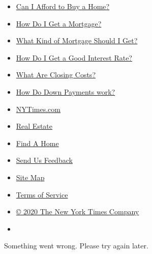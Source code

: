 \begin{itemize}
\tightlist
\item
  \href{https://www.nytimes3xbfgragh.onion/interactive/2017/realestate/Can-I-Afford-to-Buy-a-Home.html}{Can
  I Afford to Buy a Home?}
\item
  \href{https://www.nytimes3xbfgragh.onion/interactive/2017/realestate/How-Do-I-Get-a-Mortgage.html}{How
  Do I Get a Mortgage?}
\item
  \href{https://www.nytimes3xbfgragh.onion/interactive/2017/realestate/What-Kind-of-Mortgage-Should-I-Get.html}{What
  Kind of Mortgage Should I Get?}
\item
  \href{https://www.nytimes3xbfgragh.onion/interactive/2017/realestate/How-Do-I-Get-a-Good-Interest-Rate.html}{How
  Do I Get a Good Interest Rate?}
\item
  \href{https://www.nytimes3xbfgragh.onion/interactive/2017/realestate/what-are-closing-costs.html}{What
  Are Closing Costs?}
\item
  \href{https://www.nytimes3xbfgragh.onion/interactive/2017/realestate/Down-payments.html}{How
  Do Down Payments work?}
\end{itemize}

\begin{itemize}
\tightlist
\item
  \href{https://www.nytimes3xbfgragh.onion/}{NYTimes.com}
\item
  \href{https://www.nytimes3xbfgragh.onion/section/realestate}{Real
  Estate}
\item
  \href{https://www.nytimes3xbfgragh.onion/real-estate/find-a-home}{Find
  A Home}
\item
  \href{https://help.nytimes3xbfgragh.onion/hc/en-us/articles/115015385887-Contact-us}{Send
  Us Feedback}
\end{itemize}

\begin{itemize}
\tightlist
\item
  \href{http://spiderbites.nytimes3xbfgragh.onion/}{Site Map}
\item
  \href{https://help.nytimes3xbfgragh.onion/hc/en-us/articles/115014893428-Terms-of-service}{Terms
  of Service}
\item
  \href{https://help.nytimes3xbfgragh.onion/hc/en-us/articles/115014792127-Copyright-notice}{©
  2020 The New York Times Company}
\end{itemize}

\begin{itemize}
\item
\end{itemize}

Something went wrong. Please try again later.
